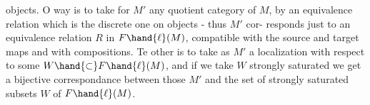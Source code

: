 objects. O way is to take for $M'$ any quotient category of $M$, by an
equivalence relation which is the discrete one on objects - thus $M'$ cor-%
responds just to an equivalence relation $R$ in $F\hand{\ell}(M)$, compatible with
 the source and target maps and with compositions. Te other is
to take as $M'$ a localization with respect to some $W\hand{\subset}F\hand{\ell}(M)$, and if we
take $W$ strongly saturated we get a bijective correspondance between those
$M'$ and the  set of strongly saturated subsets $W$ of $F\hand{\ell}(M)$.

